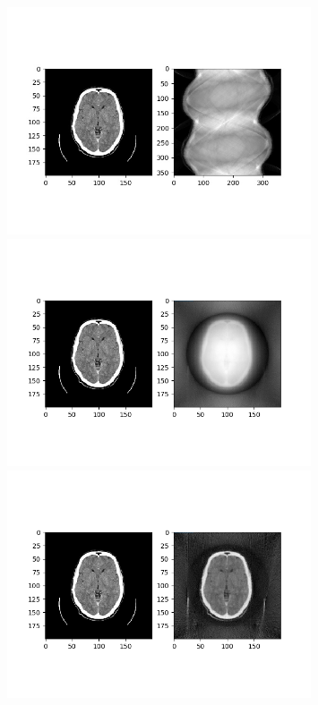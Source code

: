 \documentclass{article}
\begin{document}
\begin{figure}
\begin{center}
\includegraphics[width=0.8\textwidth]{./brain/sinogram.jpg}
\includegraphics[width=0.8\textwidth]{./brain/reconstructedImg.png}
\includegraphics[width=0.8\textwidth]{./brain/reconstructedImg2.png}
\end{center}
\end{figure}
\end{document}
